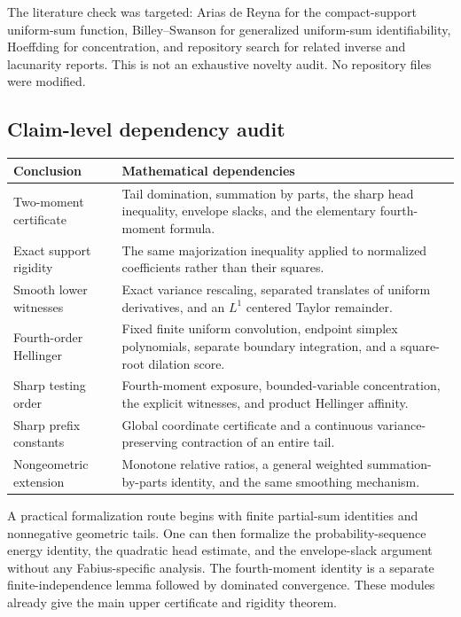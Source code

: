 \documentclass[11pt,a4paper]{article}
\numberwithin{equation}{section}
\theoremstyle{definition}
\theoremstyle{remark}
\begin{document}
The literature check was targeted: Arias de Reyna for the compact-support
uniform-sum function, Billey--Swanson for generalized uniform-sum
identifiability, Hoeffding for concentration, and repository search for
related inverse and lacunarity reports. This is not an exhaustive novelty
audit. No repository files were modified.

\subsection{Claim-level dependency audit}

\begin{center}\small
\begin{tabular}{@{}>{\raggedright\arraybackslash}p{}
>{\raggedright\arraybackslash}p{}@{}}
\toprule
Conclusion & Mathematical dependencies\\
\midrule
Two-moment certificate & Tail domination, summation by parts, the sharp
head inequality, envelope slacks, and the elementary fourth-moment formula.\\[4pt]
Exact support rigidity & The same majorization inequality applied to
normalized coefficients rather than their squares.\\[4pt]
Smooth lower witnesses & Exact variance rescaling, separated translates of
uniform derivatives, and an $L^1$ centered Taylor remainder.\\[4pt]
Fourth-order Hellinger & Fixed finite uniform convolution, endpoint simplex
polynomials, separate boundary integration, and a square-root dilation score.\\[4pt]
Sharp testing order & Fourth-moment exposure, bounded-variable concentration,
the explicit witnesses, and product Hellinger affinity.\\[4pt]
Sharp prefix constants & Global coordinate certificate and a continuous
variance-preserving contraction of an entire tail.\\[4pt]
Nongeometric extension & Monotone relative ratios, a general weighted
summation-by-parts identity, and the same smoothing mechanism.\\
\bottomrule
\end{tabular}
\end{center}

A practical formalization route begins with finite partial-sum identities and
nonnegative geometric tails. One can then formalize the probability-sequence
energy identity, the quadratic head estimate, and the envelope-slack argument
without any Fabius-specific analysis. The fourth-moment identity is a separate
finite-independence lemma followed by dominated convergence. These modules
already give the main upper certificate and rigidity theorem.
\end{document}
